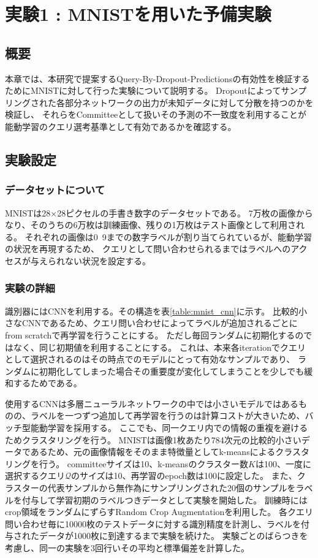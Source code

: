 \chapter{実験1 : MNISTを用いた予備実験}

\section{概要}
本章では、本研究で提案するQuery-By-Dropout-Predictionsの有効性を検証するためにMNISTに対して行った実験について説明する。
Dropoutによってサンプリングされた各部分ネットワークの出力が未知データに対して分散を持つのかを検証し、
それらをCommitteeとして扱いその予測の不一致度を利用することが能動学習のクエリ選考基準として有効であるかを確認する。


\section{実験設定}

\subsection{データセットについて}
MNISTは28×28ピクセルの手書き数字のデータセットである。
7万枚の画像からなり、そのうちの6万枚は訓練画像、残りの1万枚はテスト画像として利用される。
それぞれの画像は0~9までの数字ラベルが割り当てられているが、能動学習の状況を再現するため、
クエリとして問い合わせられるまではラベルへのアクセスが与えられない状況を設定する。


\subsection{実験の詳細}


識別器にはCNNを利用する。その構造を表\ref{table:mnist_cnn}に示す。
比較的小さなCNNであるため、クエリ問い合わせによってラベルが追加されるごとにfrom scratchで再学習を行うことにする。
ただし毎回ランダムに初期化するのではなく、同じ初期値を利用することにする。
これは、本来各iterationでクエリとして選択されるのはその時点でのモデルにとって有効なサンプルであり、
ランダムに初期化してしまった場合その重要度が変化してしまうことを少しでも緩和するためである。

使用するCNNは多層ニューラルネットワークの中では小さいモデルではあるものの、ラベルを一つずつ追加して再学習を行うのは計算コストが大きいため、バッチ型能動学習を採用する。
ここでも、同一クエリ内での情報の重複を避けるためクラスタリングを行う。
MNISTは画像1枚あたり784次元の比較的小さいデータであるため、元の画像情報をそのまま特徴量としてk-meansによるクラスタリングを行う。
committeeサイズは10、k-meansのクラスター数$K$は100、一度に選択するクエリ$\mathcal{Q}$のサイズは10、再学習のepoch数は100に設定した。
また、クラスターの代表サンプルから無作為にサンプリングされた20個のサンプルをラベルを付与して学習初期のラベルつきデータとして実験を開始した。
訓練時にはcrop領域をランダムにずらすRandom Crop Augmentationを利用した。
各クエリ問い合わせ毎に10000枚のテストデータに対する識別精度を計測し、ラベルを付与されたデータが1000枚に到達するまで実験を続けた。
実験ごとのばらつきを考慮し、同一の実験を3回行いその平均と標準偏差を計算した。


